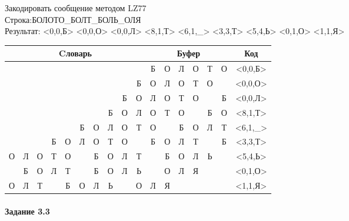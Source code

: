\documentclass[a4paper, 12pt]{article}
\begin{document}
Закодировать сообщение методом LZ77\\
Строка:БОЛОТО\_БОЛТ\_БОЛЬ\_ОЛЯ\\
Результат: <0,0,Б> <0,0,О> <0,0,Л> <8,1,Т> <6,1,\_> <3,3,Т> <5,4,Ь> <0,1,О> <1,1,Я>\\
\begin{table}[h!]
\centering
\begin{tabular}{|c|c|c|c|c|c|c|c|c|c|c|c|c|c|c|c|c|} 
\hline
\multicolumn{10}{|c|}{Cловарь} & \multicolumn{6}{c|}{Буфер} & Код  \\ \hline
  &   &   &   &   &   &   &   &   &   & \cellcolor[HTML]{8CE4F6} Б & О & Л & О & Т & О & <0,0,Б>
\\ \hline
  &   &   &   &   &   &   &   &   & Б & \cellcolor[HTML]{8CE4F6} О & Л & О & Т & О &   & <0,0,О>
\\ \hline
  &   &   &   &   &   &   &   & Б & О & \cellcolor[HTML]{8CE4F6} Л & О & Т & О &   & Б & <0,0,Л>
\\ \hline
  &   &   &   &   &   &   & Б & \cellcolor[HTML]{FFFF00} О & Л & \cellcolor[HTML]{FFFF00} О & \cellcolor[HTML]{8CE4F6} Т & О &   & Б & О & <8,1,Т>
\\ \hline
  &   &   &   &   & Б & \cellcolor[HTML]{FFFF00} О & Л & О & Т & \cellcolor[HTML]{FFFF00} О & \cellcolor[HTML]{8CE4F6}   & Б & О & Л & Т & <6,1,\_>
\\ \hline
  &   &   & \cellcolor[HTML]{FFFF00} Б & \cellcolor[HTML]{FFFF00} О & \cellcolor[HTML]{FFFF00} Л & О & Т & О &   & \cellcolor[HTML]{FFFF00} Б & \cellcolor[HTML]{FFFF00} О & \cellcolor[HTML]{FFFF00} Л & \cellcolor[HTML]{8CE4F6} Т &   & Б & <3,3,Т>
\\ \hline
О & Л & О & Т & О & \cellcolor[HTML]{FFFF00}   & \cellcolor[HTML]{FFFF00} Б & \cellcolor[HTML]{FFFF00} О & \cellcolor[HTML]{FFFF00} Л & Т & \cellcolor[HTML]{FFFF00}   & \cellcolor[HTML]{FFFF00} Б & \cellcolor[HTML]{FFFF00} О & \cellcolor[HTML]{FFFF00} Л & \cellcolor[HTML]{8CE4F6} Ь &   & <5,4,Ь>
\\ \hline
\cellcolor[HTML]{FFFF00}   & Б & О & Л & Т &   & Б & О & Л & Ь & \cellcolor[HTML]{FFFF00}   & \cellcolor[HTML]{8CE4F6} О & Л & Я &   &   & <0,1,О>
\\ \hline
О & \cellcolor[HTML]{FFFF00} Л & Т &   & Б & О & Л & Ь &   & О & \cellcolor[HTML]{FFFF00} Л & \cellcolor[HTML]{8CE4F6} Я &   &   &   &   & <1,1,Я>
\\ \hline
\end{tabular}
\end{table}

\paragraph{Задание 3.3}
\end{document}
